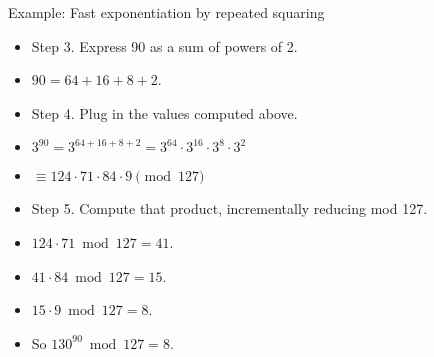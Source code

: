 \documentclass{beamer}
\begin{document}
\begin{frame}{Example: Fast exponentiation by repeated squaring}
\begin{itemize}
  \item Step 3. Express 90 as a sum of powers of 2.
  \item $90 = 64+16+8+2$.
  \item Step 4. Plug in the values computed above.
  \item $3^{90} = 3^{64+16+8+2} = 3^{64} \cdot 3^{16} \cdot 3^{8} \cdot 3^{2}$
  \item $\equiv 124 \cdot 71 \cdot 84 \cdot 9  \pmod {127}$
  \item Step 5. Compute that product, incrementally reducing mod 127.
  \item $124 \cdot 71 \bmod 127 = 41$.
  \item $41 \cdot 84 \bmod 127 = 15$.
  \item $15 \cdot 9 \bmod 127 = 8$.
  \item So $130^{90} \bmod 127 = 8$.
\end{itemize}
\end{frame}
\end{document}
